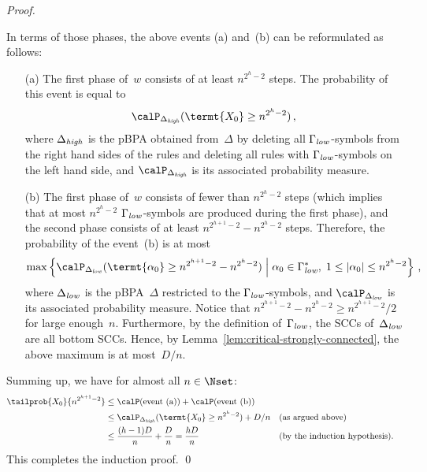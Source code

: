 \begin{proof}
\begin{itemize}
 \end{itemize}
 In terms of those phases, the above events (a) and~(b) can be reformulated as follows:
 \begin{itemize}
  \item[(a)]
   The first phase of~$w$ consists of at least $n^{2^h-2}$ steps.
   The probability of this event is equal to
    \[
     \calP_{\DeltaH}(\termt{X_0} \ge n^{2^h-2})\,,
    \]
   where $\Delta_{\it high}$ is the pBPA obtained from~$\Delta$ by deleting all $\Gamma_{\it low}$-symbols
   from the right hand sides of the rules and deleting all rules with $\Gamma_{\it low}$-symbols on the left hand side,
   and $\calP_{\DeltaH}$ is its associated probability measure.
  \item[(b)]
   The first phase of~$w$ consists of fewer than $n^{2^h-2}$ steps
    (which implies that at most $n^{2^h-2}$ $\Gamma_{\it low}$-symbols are produced during the first phase),
    and the second phase consists of at least $n^{2^{h+1}-2} - n^{2^{h}-2}$ steps.
   Therefore, the probability of the event~(b) is at most
    \[
     \max \left\{ \calP_{\DeltaL}(\termt{\alpha_0} \ge n^{2^{h+1}-2} - n^{2^h-2})
      \;\middle\vert\; \alpha_0 \in \GammaL^*,\; 1 \le |\alpha_0| \le n^{2^h-2} \right\}\,,
    \]
    where $\Delta_{\it low}$ is the pBPA~$\Delta$ restricted to the $\Gamma_{\it low}$-symbols,
     and $\calP_{\DeltaL}$ is its associated probability measure.
   Notice that $n^{2^{h+1}-2} - n^{2^h-2} \ge n^{2^{h+1}-2} / 2$ for large enough~$n$.
   Furthermore, by the definition of~$\Gamma_{\it low}$, the SCCs of~$\Delta_{\it low}$ are all bottom SCCs.
   Hence, by Lemma~\ref{lem:critical-strongly-connected}, the above maximum is at most~$D/n$.
 \end{itemize}
 Summing up, we have for almost all $n \in \Nset$:
 \begin{align*}
  \tailprob{X_0}{n^{2^{h+1}-2}}
  & \le \calP(\text{event~(a)}) + \calP(\text{event~(b)}) \\
  & \le \calP_{\DeltaH}(\termt{X_0} \ge n^{2^h-2})   +   D/n     && \text{(as argued above)} \\
  & \le \frac{(h-1)D}{n} + \frac{D}{n} = \frac{hD}{n}           && \text{(by the induction hypothesis).}
 \end{align*}
 This completes the induction proof.
\qed
\end{proof}
